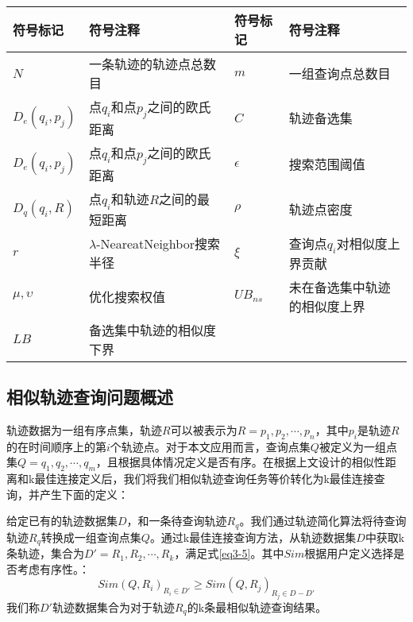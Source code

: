 \begin{table}[!htpb]
  	\centering
		\begin{tabular}{ |p{1.5cm}||p{5.5cm}|p{1.5cm}||p{5.5cm}| }
		\hline
		符号标记 & 符号注释 & 符号标记 & 符号注释\\
		\hline
		$N$ & 一条轨迹的轨迹点总数目 & $m$ & 一组查询点总数目\\
		\hline
		$D_{e}(q_{i},p_{j})$ & 点$q_{i}$和点$p_{j}$之间的欧氏距离 & $C$ & 轨迹备选集 \\
		\hline
		$D_{e}(q_{i},p_{j})$ & 点$q_{i}$和点$p_{j}$之间的欧氏距离 & $\epsilon$ & 搜索范围阈值\\
		\hline
		$D_{q}(q_{i},R)$ & 点$q_{i}$和轨迹$R$之间的最短距离 & $\rho$ & 轨迹点密度 \\
		\hline
		$r$ & $\lambda$-NeareatNeighbor搜索半径 & $\xi$ & 查询点$q_{i}$对相似度上界贡献\\
		\hline
		$\mu,\upsilon$ & 优化搜索权值 & $UB_{ns}$ & 未在备选集中轨迹的相似度上界\\
		\hline
		$LB$ & 备选集中轨迹的相似度下界 & & \\
		\hline
		\end{tabular}
\end{table}


\subsection{相似轨迹查询问题概述}
\label{sec:problem Forumation}
轨迹数据为一组有序点集，轨迹$R$可以被表示为$R={p_{1}, p_{2}, \cdots, p_{n}}$，其中$p_{i}$是轨迹$R$的在时间顺序上的第$i$个轨迹点。对于本文应用而言，查询点集$Q$被定义为一组点集$Q={q_{1}, q_{2}, \cdots, q_{m}}$，且根据具体情况定义是否有序。在根据上文设计的相似性距离和k最佳连接定义后，我们将我们相似轨迹查询任务等价转化为k最佳连接查询，并产生下面的定义：

\begin{definition}
	给定已有的轨迹数据集$D$，和一条待查询轨迹$R_{q}$。我们通过轨迹简化算法\cite{visvalingam1990douglas,chen2009trajectory}将待查询轨迹$R_{q}$转换成一组查询点集$Q$。通过k最佳连接查询方法，从轨迹数据集$D$中获取k条轨迹，集合为$D' = {R_{1}, R_{2}, \cdots, R_{k}}$，满足式\ref{eq3-5}。其中$Sim$根据用户定义选择是否考虑有序性。：
	\begin{equation}
		\label{eq3-5}
		Sim(Q,R_{i})_{R_{i} \in D'} \geq Sim(Q,R_{j})_{R_{j} \in D-D'}
	\end{equation}
	我们称$D'$轨迹数据集合为对于轨迹$R_{q}$的k条最相似轨迹查询结果。
\end{definition}

